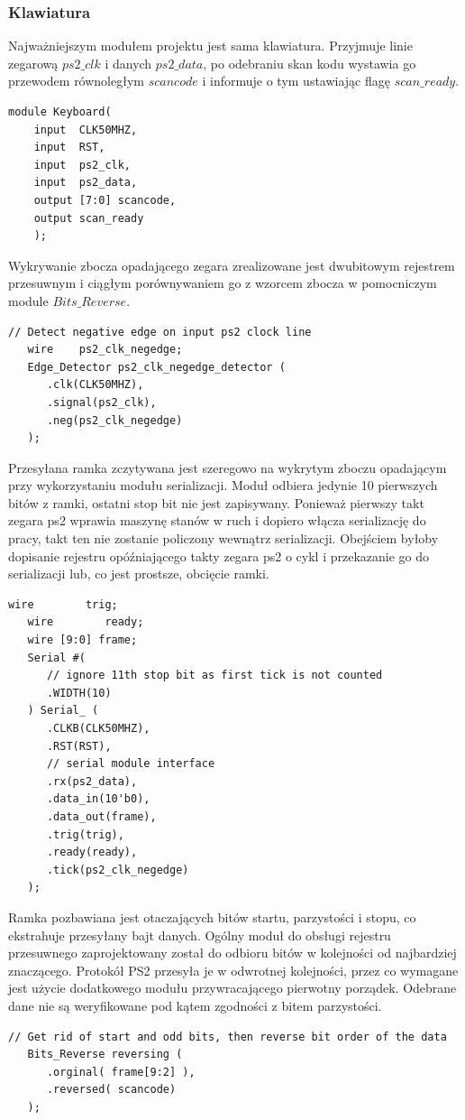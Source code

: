 \documentclass[a4paper,12pt]{article}
\begin{document}
\subsubsection{Klawiatura}
Najważniejszym modułem projektu jest sama klawiatura. Przyjmuje linie zegarową $ps2\_clk$ i danych $ps2\_data$, po odebraniu skan kodu wystawia go przewodem równoległym $scancode$ i informuje o tym ustawiając flagę $scan\_ready$.
\begin{lstlisting}[label=Keyboard,caption=Keyboard.v]
module Keyboard(
    input  CLK50MHZ,
    input  RST,
    input  ps2_clk,
    input  ps2_data,
    output [7:0] scancode,
    output scan_ready
    );
\end{lstlisting}

Wykrywanie zbocza opadającego zegara zrealizowane jest dwubitowym rejestrem przesuwnym i ciągłym porównywaniem go z wzorcem zbocza w pomocniczym module $Bits\_Reverse$.
\begin{lstlisting}[label=Keyboard,caption=Keyboard.v,firstnumber=10]
   // Detect negative edge on input ps2 clock line
   wire    ps2_clk_negedge;
   Edge_Detector ps2_clk_negedge_detector (
      .clk(CLK50MHZ),
      .signal(ps2_clk),
      .neg(ps2_clk_negedge)
   );
\end{lstlisting}

Przesyłana ramka zczytywana jest szeregowo na wykrytym zboczu opadającym przy wykorzystaniu modułu serializacji. Moduł odbiera jedynie 10 pierwszych bitów z ramki, ostatni stop bit nie jest zapisywany. Ponieważ pierwszy takt zegara ps2 wprawia maszynę stanów w ruch i dopiero włącza serializację do pracy, takt ten nie zostanie policzony wewnątrz serializacji. Obejściem byłoby dopisanie rejestru opóźniającego takty zegara ps2 o cykl i przekazanie go do serializacji lub, co jest prostsze, obcięcie ramki.
\begin{lstlisting}[label=Keyboard,caption=Keyboard.v,firstnumber=18]
   wire        trig;
   wire        ready;
   wire [9:0] frame;
   Serial #(
      // ignore 11th stop bit as first tick is not counted
      .WIDTH(10)
   ) Serial_ (
      .CLKB(CLK50MHZ),
      .RST(RST),
      // serial module interface
      .rx(ps2_data),
      .data_in(10'b0),
      .data_out(frame),
      .trig(trig),
      .ready(ready),
      .tick(ps2_clk_negedge)
   );
\end{lstlisting}

Ramka pozbawiana jest otaczających bitów startu, parzystości i stopu, co ekstrahuje przesyłany bajt danych. Ogólny moduł do obsługi rejestru przesuwnego zaprojektowany został do odbioru bitów w kolejności od najbardziej znaczącego. Protokół PS2 przesyła je w odwrotnej kolejności, przez co wymagane jest użycie dodatkowego modułu przywracającego pierwotny porządek. Odebrane dane nie są weryfikowane pod kątem zgodności z bitem parzystości.
\begin{lstlisting}[label=Keyboard,caption=Keyboard.v,firstnumber=36]
   // Get rid of start and odd bits, then reverse bit order of the data
   Bits_Reverse reversing (
      .orginal( frame[9:2] ),
      .reversed( scancode)
   );
\end{lstlisting}
\end{document}
